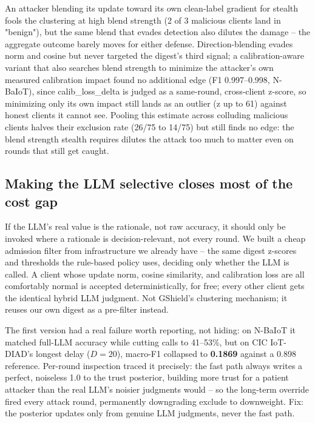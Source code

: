 \documentclass[conference]{IEEEtran}
\begin{document}
An attacker blending its update toward its own clean-label gradient for stealth \cite{bagdasaryan2020backdoor} fools the clustering at high blend strength (2 of 3 malicious clients land in "benign"), but the same blend that evades detection also dilutes the damage -- the aggregate outcome barely moves for either defense. Direction-blending evades norm and cosine but never targeted the digest's third signal; a calibration-aware variant that also searches blend strength to minimize the attacker's own measured calibration impact found no additional edge (F1 0.997--0.998, N-BaIoT), since calib\_loss\_delta is judged as a same-round, cross-client z-score, so minimizing only its own impact still lands as an outlier (z up to 61) against honest clients it cannot see. Pooling this estimate across colluding malicious clients halves their exclusion rate (26/75 to 14/75) but still finds no edge: the blend strength stealth requires dilutes the attack too much to matter even on rounds that still get caught.

\subsection{Making the LLM selective closes most of the cost gap}
If the LLM's real value is the rationale, not raw accuracy, it should only be invoked where a rationale is decision-relevant, not every round. We built a cheap admission filter from infrastructure we already have -- the same digest z-scores and thresholds the rule-based policy uses, deciding only whether the LLM is called. A client whose update norm, cosine similarity, and calibration loss are all comfortably normal is accepted deterministically, for free; every other client gets the identical hybrid LLM judgment. Not GShield's clustering mechanism; it reuses our own digest as a pre-filter instead.

The first version had a real failure worth reporting, not hiding: on N-BaIoT it matched full-LLM accuracy while cutting calls to 41--53\%, but on CIC IoT-DIAD's longest delay ($D{=}20$), macro-F1 collapsed to \textbf{0.1869} against a 0.898 reference. Per-round inspection traced it precisely: the fast path always writes a perfect, noiseless 1.0 to the trust posterior, building more trust for a patient attacker than the real LLM's noisier judgments would -- so the long-term override fired every attack round, permanently downgrading exclude to downweight. Fix: the posterior updates only from genuine LLM judgments, never the fast path.
\end{document}
